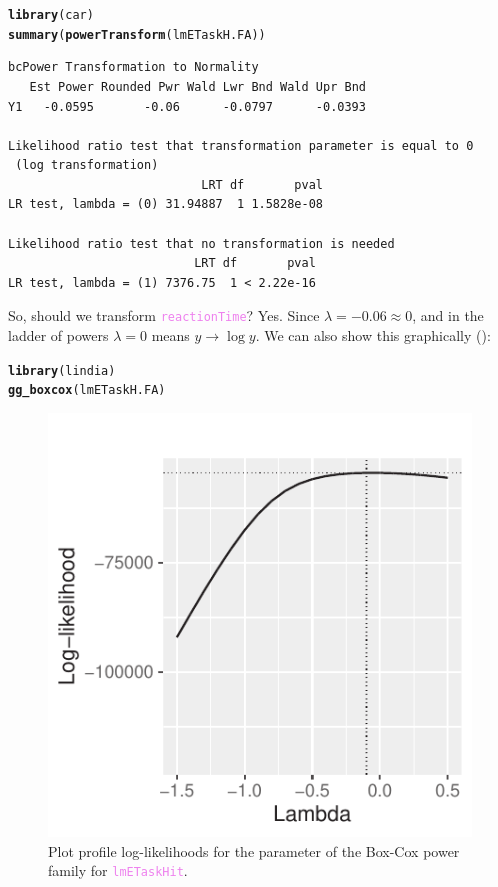 \documentclass{article}\usepackage[]{graphicx}\usepackage[]{color}
\makeatletter
\newcommand{\hlstd}[1]{\textcolor[rgb]{0.345,0.345,0.345}{#1}}%
\newcommand{\hlkwd}[1]{\textcolor[rgb]{0.737,0.353,0.396}{\textbf{#1}}}%
\newenvironment{kframe}{%
 \def\at@end@of@kframe{}%
 \ifinner\ifhmode%
  \def\at@end@of@kframe{\end{minipage}}%
  \begin{minipage}{\columnwidth}%
 \fi\fi%
 \def\FrameCommand##1{\hskip\@totalleftmargin \hskip-\fboxsep
 \colorbox{shadecolor}{##1}\hskip-\fboxsep
     \hskip-\linewidth \hskip-\@totalleftmargin \hskip\columnwidth}%
 \MakeFramed {\advance\hsize-\width
   \@totalleftmargin\z@ \linewidth\hsize
   \@setminipage}}%
 {\par\unskip\endMakeFramed%
 \at@end@of@kframe}
\newenvironment{knitrout}{}{} %
\newcommand{\code}[1]{\textup{\texttt{\textcolor{violet}{#1}}}}
\makeatother
\begin{document}
\begin{knitrout}\footnotesize
{}\color{fgcolor}\begin{kframe}
\begin{alltt}
\hlkwd{library}\hlstd{(car)}
\hlkwd{summary}\hlstd{(}\hlkwd{powerTransform}\hlstd{(lmETaskH.FA))}
\end{alltt}
\begin{verbatim}
bcPower Transformation to Normality 
   Est Power Rounded Pwr Wald Lwr Bnd Wald Upr Bnd
Y1   -0.0595       -0.06      -0.0797      -0.0393

Likelihood ratio test that transformation parameter is equal to 0
 (log transformation)
                           LRT df       pval
LR test, lambda = (0) 31.94887  1 1.5828e-08

Likelihood ratio test that no transformation is needed
                          LRT df       pval
LR test, lambda = (1) 7376.75  1 < 2.22e-16
\end{verbatim}
\end{kframe}
\end{knitrout}

\noindent So, should we transform \code{reactionTime}? Yes. Since $\lambda = -0.06 \approx 0$, and in the ladder of powers $\lambda = 0$ means $y \rightarrow \log{y}$. We can also show this graphically ():

\begin{knitrout}\footnotesize
{}\color{fgcolor}\begin{kframe}
\begin{alltt}
\hlkwd{library}\hlstd{(lindia)}
\hlkwd{gg_boxcox}\hlstd{(lmETaskH.FA)}
\end{alltt}
\end{kframe}
\end{knitrout}

\begin{figure}
\begin{knitrout}\footnotesize
{}\color{fgcolor}

{\centering \includegraphics[width=.5\linewidth]{figure/graphics-lm_eTaskHit_boxcox_show-1} 

}



\end{knitrout}
\caption{Plot profile log-likelihoods for the parameter of the Box-Cox power family for \code{lmETaskHit}.}\label{fig:eTaskBoxCox}
\end{figure}
\end{document}
